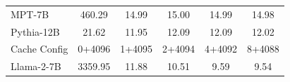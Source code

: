 \begin{minipage}[t]{\textwidth}
\begin{minipage}[t]{0.57\textwidth}
\begin{tabular}{lccccc}
MPT-7B     & 460.29                              & 14.99                      & 15.00                      & 14.99                      & 14.98                       \\
Pythia-12B & 21.62                               & 11.95                      & 12.09                      & 12.09                      & 12.02                       \\
\midrule
\midrule
Cache Config  & 0+4096 & 1+4095 & 2+4094 & 4+4092 & 8+4088 \\
\midrule
Llama-2-7B & 3359.95                             & 11.88                      & 10.51                      & 9.59                       & 9.54                     \\
\bottomrule
\end{tabular}
  \end{minipage}
\end{minipage}
